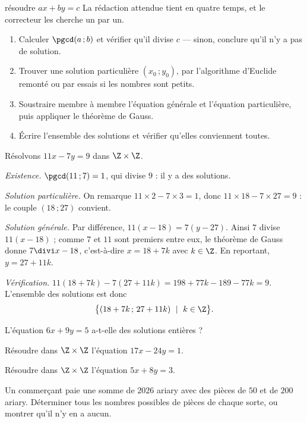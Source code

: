 \begin{methode}{résoudre $ax+by = c$}
La rédaction attendue tient en quatre temps, et le correcteur les cherche un
par un.
\begin{enumerate}[label=\textbf{\arabic*.}, leftmargin=*, itemsep=0.15em]
  \item Calculer $\pgcd(a\,;b)$ et vérifier qu'il divise $c$ — sinon,
        conclure qu'il n'y a pas de solution.
  \item Trouver une solution particulière $(x_{0}\,;y_{0})$, par
        l'algorithme d'Euclide remonté ou par essais si les nombres sont
        petits.
  \item Soustraire membre à membre l'équation générale et l'équation
        particulière, puis appliquer le théorème de Gauss.
  \item Écrire l'ensemble des solutions et vérifier qu'elles conviennent
        toutes.
\end{enumerate}
\end{methode}

\begin{exemple}
Résolvons $11x-7y = 9$ dans $\Z\times\Z$.

\smallskip
\emph{Existence.} $\pgcd(11\,;7) = 1$, qui divise $9$ : il y a des solutions.

\smallskip
\emph{Solution particulière.} On remarque $11\times2-7\times3 = 1$, donc
$11\times18-7\times27 = 9$ : le couple $(18\,;27)$ convient.

\smallskip
\emph{Solution générale.} Par différence,
$11(x-18) = 7(y-27)$. Ainsi $7$ divise $11(x-18)$ ; comme $7$ et $11$ sont
premiers entre eux, le théorème de Gauss donne $7 \divi x-18$, c'est-à-dire
$x = 18+7k$ avec $k \in \Z$. En reportant, $y = 27+11k$.

\smallskip
\emph{Vérification.} $11(18+7k)-7(27+11k) = 198+77k-189-77k = 9$. L'ensemble
des solutions est donc
\[
  \bigl\{(18+7k\,;\,27+11k) \ \mid \ k \in \Z\bigr\}.
\]
\end{exemple}

\begin{entrainement}
\exo[\niveau{1}] L'équation $6x+9y = 5$ a-t-elle des solutions entières ?

\exo[\niveau{2}] Résoudre dans $\Z\times\Z$ l'équation $17x-24y = 1$.

\exo[\niveau{2}] Résoudre dans $\Z\times\Z$ l'équation $5x+8y = 3$.

\exo[\niveau{3}] Un commerçant paie une somme de $2026$ ariary avec des
pièces de $50$ et de $200$ ariary. Déterminer tous les nombres possibles de
pièces de chaque sorte, ou montrer qu'il n'y en a aucun.
\end{entrainement}

